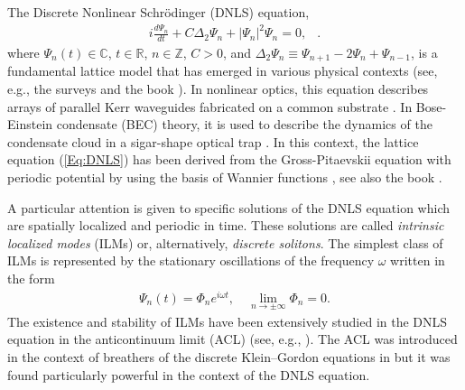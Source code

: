 \documentclass[12pt,reqno]{amsart}
\begin{document}
The Discrete Nonlinear Schr\"odinger (DNLS) equation, 
\begin{align}
    i\frac{d\Psi_n}{d t}+C\Delta_2\Psi_n+\left|\Psi_n\right|^2\Psi_n=0, \label{Eq:DNLS}
   & .
\end{align}
where $\Psi_n(t) \in \mathbb{C}$, $t \in \mathbb{R}$, $n \in \mathbb{Z}$, $C > 0$, and $\Delta_2\Psi_n \equiv \Psi_{n+1}-2\Psi_n+\Psi_{n-1}$, 
is a fundamental lattice model that has emerged in various physical contexts (see, e.g., the  surveys \cite{HTs99,EJ2003} and the book \cite{K2009}). In nonlinear optics, this equation  describes arrays of parallel Kerr waveguides fabricated on a common substrate \cite{ChLS03,DiscrSol08}.  In  Bose-Einstein condensate (BEC) theory, it is used to describe the dynamics of the condensate cloud in a sigar-shape optical trap \cite{TS01,KB04,MO06}. In this context, the lattice equation (\ref{Eq:DNLS}) has been derived from the Gross-Pitaevskii equation with periodic potential by using the basis of Wannier functions \cite{AKKS04}, see also the book \cite{Pel11}.  

A particular attention is given to specific solutions of the DNLS equation which are spatially localized and periodic in time. These solutions are called {\it intrinsic localized modes} (ILMs) or, alternatively, {\it  discrete solitons}. The simplest class of  ILMs is represented by the stationary oscillations of the frequency $\omega$ written in the form
\begin{gather}
\Psi_n(t) = \Phi_n e^{i\omega t},\quad \lim_{n \to \pm \infty} \Phi_n = 0. \label{Eq:SolitonCond}
\end{gather}
The existence and stability of ILMs have been extensively studied in the DNLS equation in the anticontinuum limit (ACL) (see, e.g., \cite{ABK04,PKF05,Yo16}). The ACL was introduced in the context of 
breathers of the discrete Klein--Gordon equations in \cite{MA1994,A1997} 
but it was found particularly powerful in the context of the DNLS equation. 
\end{document}
